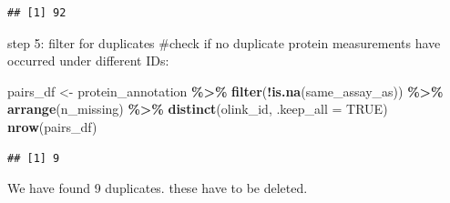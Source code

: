 \documentclass[
]{article}
\newenvironment{Shaded}{\begin{snugshade}}{\end{snugshade}}
\newcommand{\AttributeTok}[1]{\textcolor[rgb]{0.13,0.29,0.53}{#1}}
\newcommand{\ConstantTok}[1]{\textcolor[rgb]{0.56,0.35,0.01}{#1}}
\newcommand{\ControlFlowTok}[1]{\textcolor[rgb]{0.13,0.29,0.53}{\textbf{#1}}}
\newcommand{\FunctionTok}[1]{\textcolor[rgb]{0.13,0.29,0.53}{\textbf{#1}}}
\newcommand{\NormalTok}[1]{#1}
\newcommand{\OtherTok}[1]{\textcolor[rgb]{0.56,0.35,0.01}{#1}}
\newcommand{\SpecialCharTok}[1]{\textcolor[rgb]{0.81,0.36,0.00}{\textbf{#1}}}
\begin{document}
\begin{Shaded}
\end{Shaded}

\begin{verbatim}
## [1] 92
\end{verbatim}

step 5: filter for duplicates \#check if no duplicate protein
measurements have occurred under different IDs:

\begin{Shaded}
\begin{Highlighting}[]
\NormalTok{pairs\_df }\OtherTok{\textless{}{-}}\NormalTok{ protein\_annotation }\SpecialCharTok{\%\textgreater{}\%}
  \FunctionTok{filter}\NormalTok{(}\SpecialCharTok{!}\FunctionTok{is.na}\NormalTok{(same\_assay\_as)) }\SpecialCharTok{\%\textgreater{}\%}
  \FunctionTok{arrange}\NormalTok{(n\_missing) }\SpecialCharTok{\%\textgreater{}\%}
  \FunctionTok{distinct}\NormalTok{(olink\_id, }\AttributeTok{.keep\_all =} \ConstantTok{TRUE}\NormalTok{)}
\FunctionTok{nrow}\NormalTok{(pairs\_df)}
\end{Highlighting}
\end{Shaded}

\begin{verbatim}
## [1] 9
\end{verbatim}

We have found 9 duplicates. these have to be deleted.

\begin{Shaded}
\end{Shaded}
\end{document}
